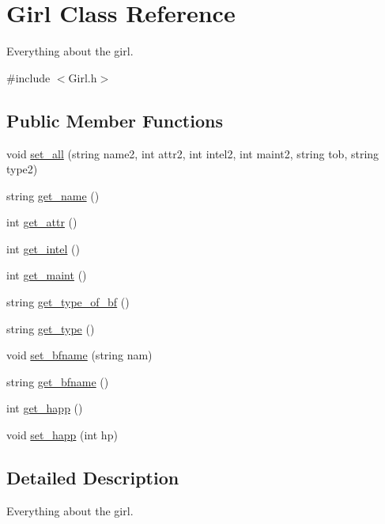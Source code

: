 \hypertarget{classGirl}{}\section{Girl Class Reference}
\label{classGirl}


Everything about the girl.  




{\ttfamily \#include $<$Girl.\+h$>$}

\subsection*{Public Member Functions}
\begin{DoxyCompactItemize}
\item 
void \hyperlink{classGirl_aa63d062fe13de87cccda70537d7eb91c}{set\+\_\+all} (string name2, int attr2, int intel2, int maint2, string tob, string type2)
\item 
string \hyperlink{classGirl_ae21337ca89029d6b5bbba9ff01694a2e}{get\+\_\+name} ()
\item 
int \hyperlink{classGirl_ad85944559b5d1625ca28052ed5724aad}{get\+\_\+attr} ()
\item 
int \hyperlink{classGirl_a86d5efa1b60fc9823f3e95f362f60aaa}{get\+\_\+intel} ()
\item 
int \hyperlink{classGirl_a08e38c5218b5ab4372ad44a873989774}{get\+\_\+maint} ()
\item 
string \hyperlink{classGirl_a1e1ffa542b554118319d2ced3867ed95}{get\+\_\+type\+\_\+of\+\_\+bf} ()
\item 
string \hyperlink{classGirl_a63e4086c7849a10410af9031aabf4eae}{get\+\_\+type} ()
\item 
void \hyperlink{classGirl_aec996595d3c0a9846565f334e968fd76}{set\+\_\+bfname} (string nam)
\item 
string \hyperlink{classGirl_adb8f00387cf2873521596573c6ccf40f}{get\+\_\+bfname} ()
\item 
int \hyperlink{classGirl_acd39699746a9220745e3d5c3f4586e38}{get\+\_\+happ} ()
\item 
void \hyperlink{classGirl_a6caadce0d6d58861f14bc49085629380}{set\+\_\+happ} (int hp)
\end{DoxyCompactItemize}


\subsection{Detailed Description}
Everything about the girl. 

